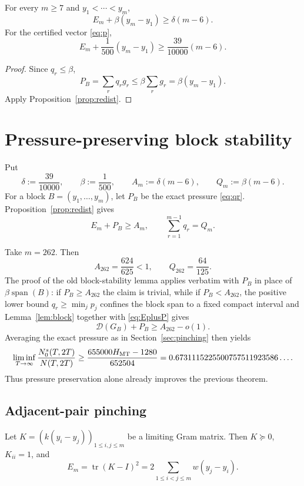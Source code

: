 \begin{corollary}\label{cor:energy}
For every \(m\ge7\) and \(y_1<\cdots<y_m\),
\[
 E_m+\beta(y_m-y_1)\ge\delta(m-6).
\]
For the certified vector \eqref{eq:p},
\[
 E_m+\frac1{500}(y_m-y_1)
 \ge\frac{39}{10000}(m-6).
\]
\end{corollary}

\begin{proof}
Since \(q_r\le\beta\),
\[
 P_B=\sum_rq_rg_r
 \le\beta\sum_rg_r
 =\beta(y_m-y_1).
\]
Apply Proposition~\ref{prop:redist}.
\end{proof}


\section{Pressure-preserving block stability}\label{sec:blockstability}

Put
\[
 \delta:=\frac{39}{10000},
 \qquad
 \beta:=\frac1{500},
 \qquad
 A_m:=\delta(m-6),
 \qquad
 Q_m:=\beta(m-6).
\]
For a block \(B=(y_1,\ldots,y_m)\), let \(P_B\) be the exact pressure
\eqref{eq:qr}.  Proposition~\ref{prop:redist} gives
\begin{equation}\label{eq:EplusP}
 E_m+P_B\ge A_m,
 \qquad
 \sum_{r=1}^{m-1}q_r=Q_m.
\end{equation}

\begin{remark}\label{rem:accounting-gain}
Take \(m=262\).  Then
\[
 A_{262}=\frac{624}{625}<1,
 \qquad
 Q_{262}=\frac{64}{125}.
\]
The proof of the old block-stability lemma applies verbatim with \(P_B\) in
place of \(\beta\operatorname{span}(B)\): if \(P_B\ge A_{262}\) the claim is
trivial, while if \(P_B<A_{262}\), the positive lower bound
\(q_r\ge\min_jp_j\) confines the block span to a fixed compact interval and
Lemma~\ref{lem:block} together with \eqref{eq:EplusP} gives
\[
 \mathcal D(G_B)+P_B\ge A_{262}-o(1).
\]
Averaging the exact pressure as in Section~\ref{sec:pinching} then yields
\[
 \liminf_{T\to\infty}\frac{N_0^s(T,2T)}{N(T,2T)}
 \ge
 \frac{655000H_{\rm MT}-1280}{652504}
 =
 0.6731115225500757511923586\ldots .
\]
Thus pressure preservation alone already improves the previous theorem.
\end{remark}


\subsection{Adjacent-pair pinching}

Let \(K=(k(y_i-y_j))_{1\le i,j\le m}\) be a limiting Gram matrix.  Then
\(K\succeq0\), \(K_{ii}=1\), and
\begin{equation}\label{eq:Em-trace}
 E_m
 =
 \operatorname{tr}(K-I)^2
 =
 2\sum_{1\le i<j\le m}w(y_j-y_i).
\end{equation}

